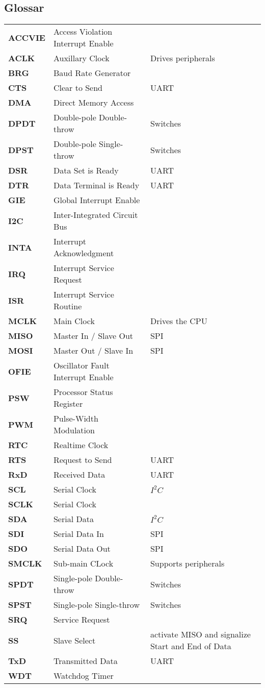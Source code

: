 \subsection*{Glossar}
\begin{tabular}{>{\bfseries}lll}
    ACCVIE  & Access Violation Interrupt Enable & \\
    ACLK    & Auxillary Clock   & Drives peripherals\\
    BRG     & Baud Rate Generator& \\
    CTS     & Clear to Send     & UART\\
    DMA     & Direct Memory Access& \\
    DPDT    & Double-pole Double-throw & Switches \\ 
    DPST    & Double-pole Single-throw & Switches \\
    DSR     & Data Set is Ready & UART\\
    DTR     & Data Terminal is Ready & UART\\
    GIE     & Global Interrupt Enable & \\
    I2C     & Inter-Integrated Circuit Bus & \\
    INTA    & Interrupt Acknowledgment& \\
    IRQ     & Interrupt Service Request& \\
    ISR     & Interrupt Service Routine& \\
    MCLK    & Main Clock        & Drives the CPU \\
    MISO    & Master In / Slave Out & SPI\\
    MOSI    & Master Out / Slave In & SPI\\
    OFIE    & Oscillator Fault Interrupt Enable & \\
    PSW     & Processor Status Register & \\
    PWM     & Pulse-Width Modulation& \\
    RTC     & Realtime Clock    & \\
    RTS     & Request to Send   & UART\\
    RxD     & Received Data     & UART\\
    SCL     & Serial Clock      & $ I^2C $\\
    SCLK    & Serial Clock      & \\
    SDA     & Serial Data       & $ I^2C $\\
    SDI     & Serial Data In    & SPI\\
    SDO     & Serial Data Out   & SPI\\
    SMCLK   & Sub-main CLock    & Supports peripherals\\
    SPDT    & Single-pole Double-throw & Switches \\
    SPST    & Single-pole Single-throw & Switches \\
    SRQ     & Service Request   & \\
    SS      & Slave Select      & activate MISO and signalize Start and End of Data\\
    TxD     & Transmitted Data  & UART\\
    WDT     & Watchdog Timer    & \\
    

\end{tabular}
